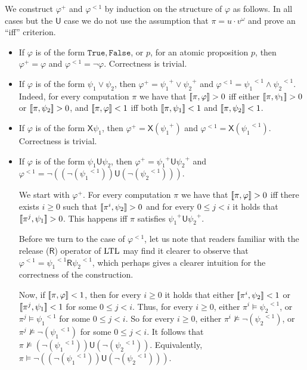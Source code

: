 \documentclass{llncs}
\newcommand{\True}{\mathtt{True}}
\newcommand{\False}{\mathtt{False}}
\newcommand{\LTL}{{\ensuremath{\rm LTL}}\xspace}
\newcommand{\Next}{\mathsf{X}}
\newcommand{\Until}{\mathsf{U}}
\newcommand{\Release}{\mathsf{R}}
\renewcommand{\phi}{\varphi}
\newcommand{\pos}[1]{{#1}^{+}}
\newcommand{\notone}[1]{{#1}^{<1}}
\begin{document}
We construct $\pos{\phi}$ and $\notone{\phi}$ by induction on the structure of $\phi$ as follows. In all cases but the $\Until$ case we do not use the assumption that $\pi=u\cdot v^\omega$ and prove an ``iff'' criterion. 
\begin{itemize}
\item If $\phi$ is of the form $\True,\False$, or $p$, for an atomic proposition $p$, then $\pos{\phi}=\phi$ and $\notone{\phi}=\neg \phi$. Correctness is trivial.

\item If $\phi$ is of the form $\psi_1\vee \psi_2$, then $\pos{\phi}=\pos{\psi_1}\vee \pos{\psi_2}$  and $\notone{\phi}=\notone{\psi_1}\wedge \notone{\psi_2}$. Indeed, for every computation $\pi$ we have that $\sem{\pi,\phi}>0$ iff either $[\![\pi,\psi_1]\!]>0$ or $[\![\pi,\psi_2]\!]>0$, and  $\sem{\pi,\phi}<1$ iff both $[\![\pi,\psi_1]\!]<1$ and $[\![\pi,\psi_2]\!]<1$.

\item If $\phi$ is of the form $\Next \psi_1$, then $\pos{\phi}=\Next (\pos{\psi_1})$ and $\notone{\phi}=\Next (\notone{\psi_1})$. Correctness is trivial.


\item If $\phi$ is of the form $\psi_1\Until \psi_2$, then $\pos{\phi}=\pos{\psi_1}\Until \pos{\psi_2}$ and $\notone{\phi}=\neg((\neg (\notone{\psi_1}))\Until (\neg (\notone{\psi_2})))$. 

We start with $\pos{\phi}$. For every computation $\pi$ we have that $\sem{\pi,\phi}>0$ iff there exists $i\ge 0$ such that $[\![\pi^i,\psi_2]\!]>0$ and for every $0\le j<i$ it holds that $[\![\pi^j,\psi_1]\!]>0$. This happens iff $\pi$ satisfies $\pos{\psi_1}\Until \pos{\psi_2}$. 

Before we turn to the case of $\notone{\phi}$, let us note that
readers familiar with the release ($\Release$) operator of $\LTL$ may find it clearer to observe that $\notone{\phi}=\notone{\psi_1}\Release \notone{\psi_2}$, which perhaps gives a clearer intuition for the correctness of the construction.

Now, if $\sem{\pi,\phi}<1$, then for every $i\ge 0$ it holds that either $[\![\pi^i,\psi_2]\!]<1$ or $[\![\pi^j,\psi_1]\!]<1$ for some $0\le j<i$. Thus, for every $i\ge 0$, either $\pi^i\models \notone{\psi_2}$, or $\pi^j\models \notone{\psi_1}$ for some $0\le j<i$. So for every $i\ge 0$, either $\pi^i\not \models \neg (\notone{\psi_2})$, or $\pi^j\not\models \neg( \notone{\psi_1})$ for some $0\le j<i$. It follows that $\pi\not \models (\neg (\notone{\psi_1}))\Until (\neg (\notone{\psi_2}))$. Equivalently, $\pi\models \neg((\neg (\notone{\psi_1}))\Until (\neg (\notone{\psi_2})))$.


\end{itemize}
\end{document}
